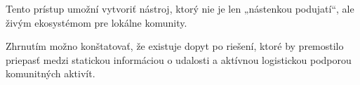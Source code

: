 Tento prístup umožní vytvoriť nástroj, ktorý nie je len „nástenkou podujatí“, ale živým ekosystémom pre lokálne komunity.

\noindent Zhrnutím možno konštatovať, že existuje dopyt po riešení,
ktoré by premostilo priepasť medzi statickou informáciou o udalosti a aktívnou logistickou podporou komunitných aktivít.













